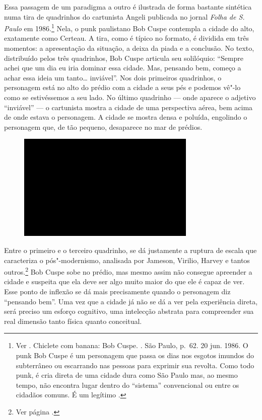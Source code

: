 Essa passagem de um paradigma a outro é ilustrada de forma bastante
sintética numa tira de quadrinhos do cartunista Angeli publicada no
jornal \emph{Folha de S.\,Paulo} em 1986.\footnote{Ver . Chiclete
  com banana: Bob Cuspe. {}. São Paulo, p.~62.
  20 jun. 1986. O punk Bob Cuspe é um personagem que passa os dias nos
  esgotos imundos do subterrâneo ou escarrando nas pessoas para exprimir
  sua revolta. Como todo punk, é cria direta de uma cidade dura como São
  Paulo mas, ao mesmo tempo, não encontra lugar dentro do ``sistema''
  convencional ou entre os cidadãos comuns. É um legítimo
  {}.} Nela, o punk paulistano Bob Cuspe contempla a cidade
do alto, exatamente como Certeau. A tira, como é típico no formato, é
dividida em três momentos: a apresentação da situação, a deixa da piada
e a conclusão. No texto, distribuído pelos três quadrinhos, Bob Cuspe
articula seu solilóquio: ``Sempre achei que um dia eu iria dominar essa
cidade. Mas, pensando bem, começo a achar essa ideia um
tanto\ldots{} inviável''. Nos dois primeiros quadrinhos, o personagem
está no alto do prédio com a cidade a seus pés e podemos vê"-lo como se
estivéssemos a seu lado. No último quadrinho --- onde aparece o adjetivo
``inviável'' --- o cartunista mostra a cidade de uma perspectiva aérea,
bem acima de onde estava o personagem. A cidade se mostra densa e
poluída, engolindo o personagem que, de tão pequeno, desaparece no mar
de prédios.

\begin{figure}[!ht]

\centering
 \includegraphics[width=85mm]{./imgs/im1.jpg}
\caption{\tiny{}}

\end{figure}

Entre o primeiro e o terceiro quadrinho, se dá justamente a ruptura de
escala que caracteriza o pós"-modernismo, analisada por Jameson, Virilio,
Harvey e tantos outros.\footnote{Ver página \pageref{ruptura}.} Bob Cuspe sobe no prédio, mas mesmo assim não
consegue apreender a cidade e suspeita que ela deve ser algo muito maior
do que ele é capaz de ver. Esse ponto de inflexão se dá mais
precisamente quando o personagem diz ``pensando bem''. Uma vez que a
cidade já não se dá a ver pela experiência direta, será preciso um
esforço cognitivo, uma intelecção abstrata para compreender sua real
dimensão tanto física quanto conceitual.

